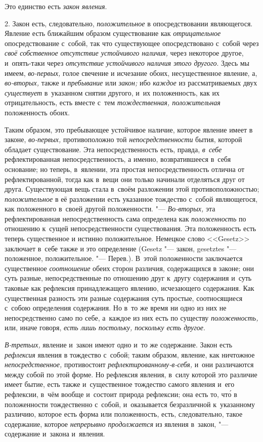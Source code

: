 Это единство есть {\em закон явления}.

2. Закон есть, следовательно, {\em положительное} в
опосредствовании являющегося. Явление есть ближайшим образом существование
как {\em отрицательное} опосредствование с~собой, так
что существующее опосредствовано с~собой через
{\em своё собственное отсутствие устойчивого наличия,}
через некоторое другое, и~опять-таки через
{\em отсутствие устойчивого наличия этого другого}.
Здесь мы имеем, {\em во-первых,} голое свечение и
исчезание обоих, несущественное явление, а,
{\em во-вторых,} также и {\em пребывание} или {\em закон;}
ибо {\em каждое} из рассматриваемых двух
{\em существует} в~указанном снятии другого, и~их
положенность, как их отрицательность, есть вместе с~тем
{\em тождественная, положительная} положенность обоих.

Таким образом, это пребывающее устойчивое наличие, которое явление имеет в
законе, {\em во-первых,} противоположно той
{\em непосредственности} бытия, которой обладает
существование. Эта непосредственность есть, правда,
{\em в~себе} рефлектированная непосредственность, а
именно, возвратившееся в~себя основание; но теперь, в~явлении, эта простая
непосредственность отлична от рефлектированной, тогда как в~вещи они только
начинали отделяться друг от друга. Существующая вещь стала в~своём
разложении этой противоположностью; {\em положительное}
в её разложении есть указанное тождество с~собой являющегося, как
положенного в~своей другой положенности. "---
{\em Во-вторых,} эта рефлектированная непосредственность сама определена как
{\em положенность} по отношению к~сущей
непосредственности существования. Эта положенность есть теперь существенное
и истинно положительное. Немецкое слово <<Gesetz>> заключает в~себе также и
это определение (Gesetz "--- закон, gesetztes "--- положенное,
положительное. "--- Перев.). В~этой положенности заключается существенное
{\em соотношение} обеих сторон различия, содержащихся в
законе; они суть разные, непосредственные по отношению друг к~другу
содержания и~суть таковые как рефлексия принадлежащего явлению, исчезающего
содержания. Как существенная разность эти разные содержания суть простые,
соотносящиеся с~собою определения содержания. Но в~то же время ни одно из
них не непосредственно само по себе, а~каждое из них есть по существу
{\em положенность,} или, иначе говоря,
{\em есть лишь постольку, поскольку есть другое}.

{\em В-третьих,} явление и~закон имеют одно и~то же
содержание. Закон есть {\em рефлексия} явления в
тождество с~собой; таким образом, явление, как ничтожное
{\em непосредственное,} противостоит
{\em рефлектированному-в-себя,} и~они различаются между
собой по этой форме. Но рефлексия явления, в~силу которой это различие
имеет бытие, есть также и~существенное тождество самого явления и~его
рефлексии, в~чём вообще и~состоит природа рефлексии; она есть то, чт\'{о} в
положенности тождественно с~собой, и~оказывается безразличной к~указанному
различию, которое есть форма или положенность, есть, следовательно, такое
содержание, которое {\em непрерывно продолжается} из
явления в~закон, "--- содержание и~закона и~явления.

